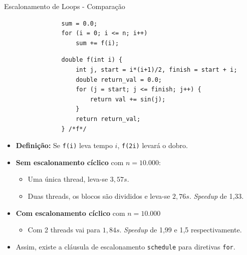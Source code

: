 	\begin{frame}[fragile]{Escalonamento de Loops - Comparação}
		\begin{multicols}{2}
			\begin{verbatim}
				sum = 0.0;
				for (i = 0; i <= n; i++) 
					sum += f(i);
			\end{verbatim}
		\columnbreak
					\pause
			\begin{verbatim}
				double f(int i) {
					int j, start = i*(i+1)/2, finish = start + i;
					double return_val = 0.0;
					for (j = start; j <= finish; j++) {
						return val += sin(j);
					}
					return return_val; 
				} /*f*/
			\end{verbatim}
		\end{multicols}


		\begin{itemize}
			\setlength\itemsep{0.3em}
			\item \textbf{Definição:} Se {\tt f(i)} leva tempo $i$, {\tt f(2i)} levará o dobro.
					\pause
			\item \textbf{Sem escalonamento cíclico} com $n=10.000$:
			\begin{itemize}
				\item Uma única thread, leva-se $3,57s$.
				\item Duas threads, os blocos são divididos e leva-se $2,76s$. \textit{Speedup}  de 1,33.
			\end{itemize}
					\pause
			\item \textbf{Com escalonamento cíclico} com $n=10.000$
			\begin{itemize}
				\item Com 2 threads vai para $1,84s$. \textit{Speedup} de 1,99 e 1,5 respectivamente.
			\end{itemize}
			\item Assim, existe a cláusula de escalonamento {\tt schedule} para diretivas {\tt for}.
		\end{itemize}
\end{frame}

